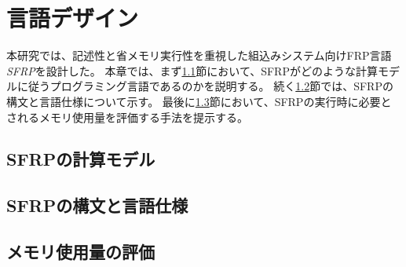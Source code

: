 \chapter{言語デザイン}\label{sec:language}
本研究では、記述性と省メモリ実行性を重視した組込みシステム向けFRP言語{\it SFRP}を設計した。
本章では、まず\ref{sec:language:model}節において、SFRPがどのような計算モデルに従うプログラミング言語であるのかを説明する。
続く\ref{sec:language:syntax}節では、SFRPの構文と言語仕様について示す。
最後に\ref{sec:language:memory}節において、SFRPの実行時に必要とされるメモリ使用量を評価する手法を提示する。

\section{SFRPの計算モデル}\label{sec:language:model}


\section{SFRPの構文と言語仕様}\label{sec:language:syntax}


\section{メモリ使用量の評価}\label{sec:language:memory}

